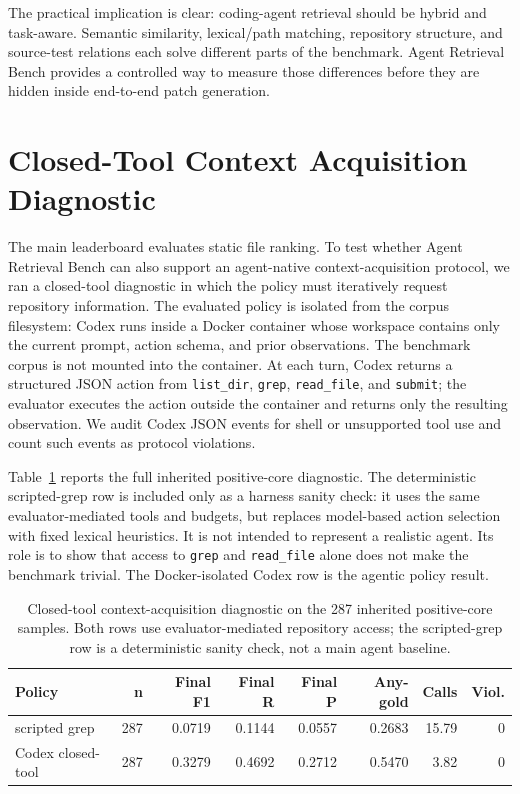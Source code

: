 \documentclass[11pt]{article}
\newcommand{\arb}{Agent Retrieval Bench}
\newcommand{\code}[1]{\texttt{#1}}
\begin{document}
The practical implication is clear: coding-agent retrieval should be hybrid and task-aware. Semantic similarity, lexical/path matching, repository structure, and source-test relations each solve different parts of the benchmark. \arb{} provides a controlled way to measure those differences before they are hidden inside end-to-end patch generation.

\appendix

\section{Closed-Tool Context Acquisition Diagnostic}
\label{app:closed-tool}

The main leaderboard evaluates static file ranking. To test whether \arb{} can also support an agent-native context-acquisition protocol, we ran a closed-tool diagnostic in which the policy must iteratively request repository information. The evaluated policy is isolated from the corpus filesystem: Codex runs inside a Docker container whose workspace contains only the current prompt, action schema, and prior observations. The benchmark corpus is not mounted into the container. At each turn, Codex returns a structured JSON action from \code{list\_dir}, \code{grep}, \code{read\_file}, and \code{submit}; the evaluator executes the action outside the container and returns only the resulting observation. We audit Codex JSON events for shell or unsupported tool use and count such events as protocol violations.

Table~\ref{tab:closed-tool-overall} reports the full inherited positive-core diagnostic. The deterministic scripted-grep row is included only as a harness sanity check: it uses the same evaluator-mediated tools and budgets, but replaces model-based action selection with fixed lexical heuristics. It is not intended to represent a realistic agent. Its role is to show that access to \code{grep} and \code{read\_file} alone does not make the benchmark trivial. The Docker-isolated Codex row is the agentic policy result.

\begin{table}[h]
\centering
\caption{Closed-tool context-acquisition diagnostic on the 287 inherited positive-core samples. Both rows use evaluator-mediated repository access; the scripted-grep row is a deterministic sanity check, not a main agent baseline.}
\label{tab:closed-tool-overall}
\small
\begin{tabular}{lrrrrrrr}
\toprule
Policy & n & Final F1 & Final R & Final P & Any-gold & Calls & Viol. \\
\midrule
scripted grep & 287 & 0.0719 & 0.1144 & 0.0557 & 0.2683 & 15.79 & 0 \\
Codex closed-tool & 287 & 0.3279 & 0.4692 & 0.2712 & 0.5470 & 3.82 & 0 \\
\bottomrule
\end{tabular}
\end{table}
\end{document}
